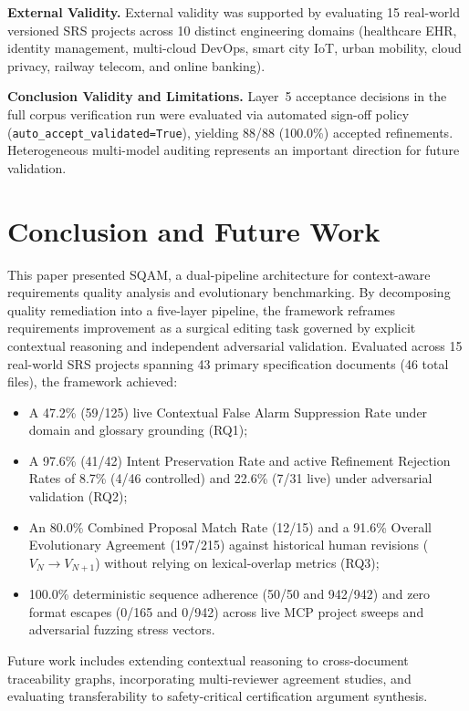 \documentclass[journal]{IEEEtran}
\begin{document}
\textbf{External Validity.} External validity was supported by evaluating 15 real-world versioned SRS projects across 10 distinct engineering domains (healthcare EHR, identity management, multi-cloud DevOps, smart city IoT, urban mobility, cloud privacy, railway telecom, and online banking).

\textbf{Conclusion Validity and Limitations.} Layer~5 acceptance decisions in the full corpus verification run were evaluated via automated sign-off policy (\texttt{auto\_accept\_validated=True}), yielding 88/88 (100.0\%) accepted refinements. Heterogeneous multi-model auditing represents an important direction for future validation.

\section{Conclusion and Future Work}
\label{sec:conclusion}

This paper presented SQAM, a dual-pipeline architecture for context-aware requirements quality analysis and evolutionary benchmarking. By decomposing quality remediation into a five-layer pipeline, the framework reframes requirements improvement as a surgical editing task governed by explicit contextual reasoning and independent adversarial validation. Evaluated across 15 real-world SRS projects spanning 43 primary specification documents (46 total files), the framework achieved:
\begin{itemize}
    \item A 47.2\% (59/125) live Contextual False Alarm Suppression Rate under domain and glossary grounding (RQ1);
    \item A 97.6\% (41/42) Intent Preservation Rate and active Refinement Rejection Rates of 8.7\% (4/46 controlled) and 22.6\% (7/31 live) under adversarial validation (RQ2);
    \item An 80.0\% Combined Proposal Match Rate (12/15) and a 91.6\% Overall Evolutionary Agreement (197/215) against historical human revisions ($V_N \to V_{N+1}$) without relying on lexical-overlap metrics (RQ3);
    \item 100.0\% deterministic sequence adherence (50/50 and 942/942) and zero format escapes (0/165 and 0/942) across live MCP project sweeps and adversarial fuzzing stress vectors.
\end{itemize}

Future work includes extending contextual reasoning to cross-document traceability graphs, incorporating multi-reviewer agreement studies, and evaluating transferability to safety-critical certification argument synthesis.



\end{document}
